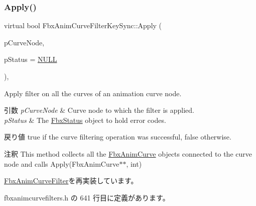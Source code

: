 \mbox{\label{class_fbx_anim_curve_filter_key_sync_ad85aff7b0cd6b4ce563002b6d52c0041}} 
\subsubsection{\texorpdfstring{Apply()}{Apply()}\hspace{0.1cm}{\footnotesize\ttfamily [3/5]}}
{\footnotesize\ttfamily virtual bool Fbx\+Anim\+Curve\+Filter\+Key\+Sync\+::\+Apply (\begin{DoxyParamCaption}\item[{\hyperlink{class_fbx_anim_curve_node}{Fbx\+Anim\+Curve\+Node} \&}]{p\+Curve\+Node,  }\item[{\hyperlink{class_fbx_status}{Fbx\+Status} $\ast$}]{p\+Status = {\ttfamily \hyperlink{fbxarch_8h_a070d2ce7b6bb7e5c05602aa8c308d0c4}{N\+U\+LL}} }\end{DoxyParamCaption})\hspace{0.3cm}{\ttfamily [inline]}, {\ttfamily [virtual]}}

Apply filter on all the curves of an animation curve node. 
\begin{DoxyParams}{引数}
{\em p\+Curve\+Node} & Curve node to which the filter is applied. \\
\hline
{\em p\+Status} & The \hyperlink{class_fbx_status}{Fbx\+Status} object to hold error codes. \\
\hline
\end{DoxyParams}
\begin{DoxyReturn}{戻り値}
{\ttfamily true} if the curve filtering operation was successful, {\ttfamily false} otherwise. 
\end{DoxyReturn}
\begin{DoxyRemark}{注釈}
This method collects all the \hyperlink{class_fbx_anim_curve}{Fbx\+Anim\+Curve} objects connected to the curve node and calls Apply(\+Fbx\+Anim\+Curve$\ast$$\ast$, int) 
\end{DoxyRemark}


\hyperlink{class_fbx_anim_curve_filter_ad042b45c0675278fa49e61739b0825c2}{Fbx\+Anim\+Curve\+Filter}を再実装しています。



 fbxanimcurvefilters.\+h の 641 行目に定義があります。

